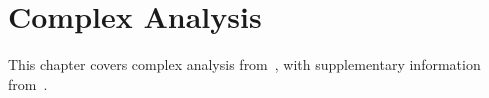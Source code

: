 %
%
%
\chapter{Complex Analysis}
This chapter covers complex analysis from~\cite{brown04}, with supplementary information from~\cite{sarason94}.







